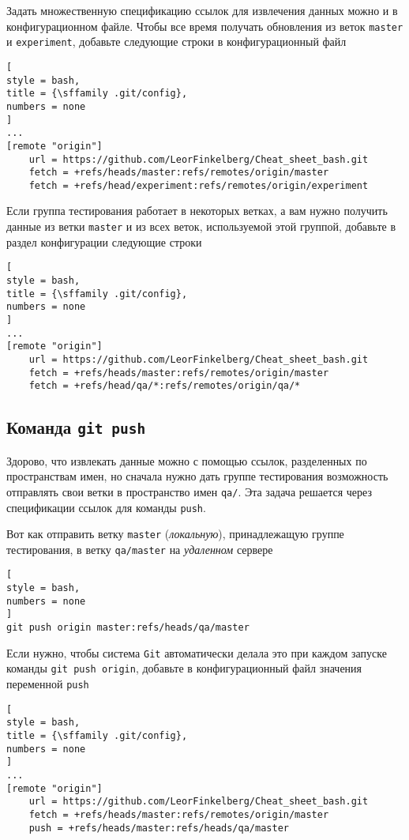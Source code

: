 \documentclass[%
	11pt,
	a4paper,
	utf8,
		]{article}
\begin{document}
Задать множественную спецификацию ссылок для извлечения данных можно и в конфигурационном файле. Чтобы все время получать обновления из веток \texttt{master} и \texttt{experiment}, добавьте следующие строки в конфигурационный файл
\begin{lstlisting}[
style = bash,
title = {\sffamily .git/config},
numbers = none
]
...
[remote "origin"]
    url = https://github.com/LeorFinkelberg/Cheat_sheet_bash.git
    fetch = +refs/heads/master:refs/remotes/origin/master
    fetch = +refs/head/experiment:refs/remotes/origin/experiment
\end{lstlisting}

Если группа тестирования работает в некоторых ветках, а вам нужно получить данные из ветки \texttt{master} и из всех веток, используемой этой группой, добавьте в раздел конфигурации следующие строки
\begin{lstlisting}[
style = bash,
title = {\sffamily .git/config},
numbers = none
]
...
[remote "origin"]
    url = https://github.com/LeorFinkelberg/Cheat_sheet_bash.git
    fetch = +refs/heads/master:refs/remotes/origin/master
    fetch = +refs/head/qa/*:refs/remotes/origin/qa/*
\end{lstlisting}


\subsection{Команда \texttt{git push}}

Здорово, что извлекать данные можно с помощью ссылок, разделенных по пространствам имен, но сначала нужно дать группе тестирования возможность отправлять свои ветки в пространство имен \verb|qa/|. Эта задача решается через спецификации ссылок для команды \texttt{push}.

Вот как отправить ветку \texttt{master} (\emph{локальную}), принадлежащую группе тестирования, в ветку \verb|qa/master| на \emph{удаленном} сервере
\begin{lstlisting}[
style = bash,
numbers = none
]
git push origin master:refs/heads/qa/master
\end{lstlisting}

Если нужно, чтобы система \texttt{Git} автоматически делала это при каждом запуске команды \texttt{git push origin}, добавьте в конфигурационный файл значения переменной \texttt{push}
\begin{lstlisting}[
style = bash,
title = {\sffamily .git/config},
numbers = none
]
...
[remote "origin"]
    url = https://github.com/LeorFinkelberg/Cheat_sheet_bash.git
    fetch = +refs/heads/master:refs/remotes/origin/master
    push = +refs/heads/master:refs/heads/qa/master
\end{lstlisting}
\end{document}
